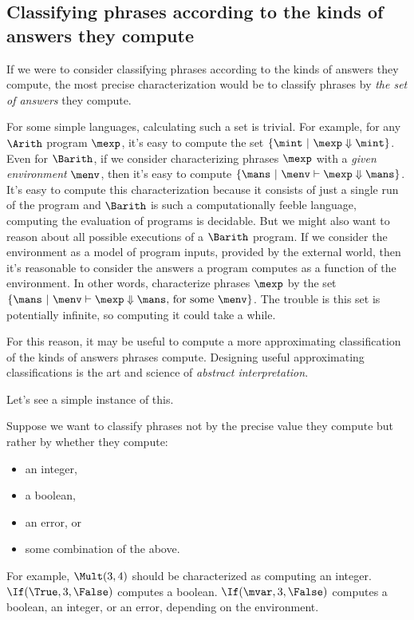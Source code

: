 \subsection{Classifying phrases according to the kinds of answers they compute}

If we were to consider classifying phrases according to the kinds of
answers they compute, the most precise characterization would be to
classify phrases by \emph{the set of answers} they compute.

For some simple languages, calculating such a set is trivial.  For
example, for any $\Arith$ program $\mexp$, it's easy to compute the
set $\{\mint\ |\ \mexp \Downarrow \mint \}$.
%
Even for $\Barith$, if we consider characterizing phrases $\mexp$ with
a \emph{given environment} $\menv$, then it's easy to compute $\{
\mans\ |\ \menv \vdash \mexp \Downarrow \mans \}$.  It's easy to
compute this characterization because it consists of just a single run
of the program and $\Barith$ is such a computationally feeble
language, computing the evaluation of programs is decidable.
%
But we might also want to reason about all possible executions of a
$\Barith$ program.  If we consider the environment as a model of
program inputs, provided by the external world, then it's reasonable
to consider the answers a program computes as a function of the
environment.  In other words, characterize phrases $\mexp$ by the set
$\{ \mans\ |\ \menv \vdash \mexp \Downarrow \mans\text{, for some
}\menv\}$.  The trouble is this set is potentially infinite, so
computing it could take a while.

For this reason, it may be useful to compute a more approximating
classification of the kinds of answers phrases compute.  Designing
useful approximating classifications is the art and science of
\emph{abstract interpretation}.

Let's see a simple instance of this.

Suppose we want to classify phrases not by the precise value they
compute but rather by whether they compute:
\begin{itemize}
\item an integer,
\item a boolean,
\item an error, or
\item some combination of the above.
\end{itemize}

For example, $\Mult(3, 4)$ should be characterized as computing an
integer.  $\If(\True,3,\False)$ computes a boolean.
$\If(\mvar,3,\False)$ computes a boolean, an integer, or an error,
depending on the environment.


